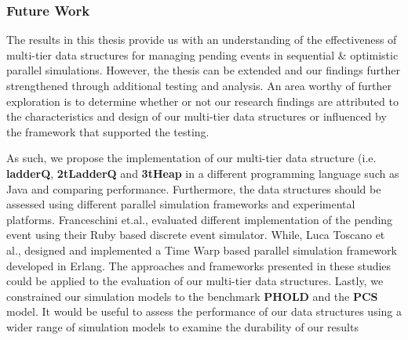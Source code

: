 \subsubsection{Future Work}

The results in this thesis provide us with an understanding of the effectiveness of multi-tier data structures for managing pending events in sequential \& optimistic parallel simulations. However, the thesis can be extended and our findings further strengthened through additional testing and analysis. An area worthy of further exploration is to determine whether or not our research findings are attributed to the characteristics and design of our multi-tier data structures or influenced by the framework that supported the testing. 

As such, we propose the implementation of our multi-tier data structure (i.e. \textbf{ladderQ}, \textbf{2tLadderQ} and \textbf{3tHeap} in a different programming language such as Java and comparing performance. Furthermore, the data structures should be assessed using different parallel simulation frameworks and experimental platforms. Franceschini et.al., evaluated different implementation of the pending event using their Ruby based discrete event simulator\cite{franceschini-15}. While, Luca Toscano et al., designed and implemented a Time Warp based parallel simulation framework developed in Erlang\cite{toscano2012parallel}. The approaches and frameworks presented in these studies could be applied to the evaluation of our multi-tier data structures. Lastly, we constrained our simulation models to the benchmark \textbf{PHOLD} and the 
\textbf{PCS} model. It would be useful to assess the performance of our data structures using a wider range of simulation models to examine the durability of our results

       






